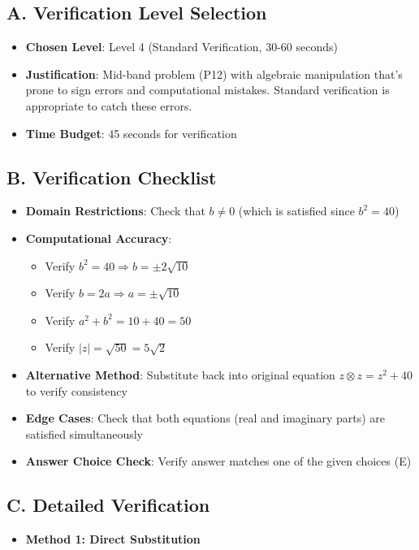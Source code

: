 \documentclass[12pt]{article}
\begin{document}
\begin{verificationbox}
\subsection*{A. Verification Level Selection}
\begin{itemize}[leftmargin=*]
    \item \textbf{Chosen Level}: Level 4 (Standard Verification, 30-60 seconds)
    \item \textbf{Justification}: Mid-band problem (P12) with algebraic manipulation that's prone to sign errors and computational mistakes. Standard verification is appropriate to catch these errors.
    \item \textbf{Time Budget}: 45 seconds for verification
\end{itemize}

\subsection*{B. Verification Checklist}
\begin{itemize}[leftmargin=*]
    \item \textbf{Domain Restrictions}: Check that $b \neq 0$ (which is satisfied since $b^2 = 40$)
    \item \textbf{Computational Accuracy}: 
    \begin{itemize}
        \item Verify $b^2 = 40 \Rightarrow b = \pm 2\sqrt{10}$
        \item Verify $b = 2a \Rightarrow a = \pm \sqrt{10}$
        \item Verify $a^2 + b^2 = 10 + 40 = 50$
        \item Verify $|z| = \sqrt{50} = 5\sqrt{2}$
    \end{itemize}
    \item \textbf{Alternative Method}: Substitute back into original equation $z \otimes z = z^2 + 40$ to verify consistency
    \item \textbf{Edge Cases}: Check that both equations (real and imaginary parts) are satisfied simultaneously
    \item \textbf{Answer Choice Check}: Verify answer matches one of the given choices (E)
\end{itemize}

\subsection*{C. Detailed Verification}
\begin{itemize}[leftmargin=*]
    \item \textbf{Method 1: Direct Substitution}
    

\end{itemize}
\end{verificationbox}
\end{document}
